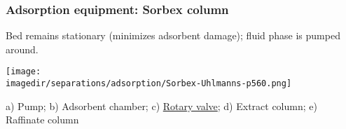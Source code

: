\begin{frame}\frametitle{Adsorption equipment: Sorbex column}
	{\scriptsize Bed remains stationary (minimizes adsorbent damage); fluid phase is pumped around.}
	\begin{center}
		\texttt{[image: \\imagedir/separations/adsorption/Sorbex-Uhlmanns-p560.png]}
	\end{center}
	\vspace{-12pt}

	{\tiny a) Pump; b) Adsorbent chamber; c) \href{http://www.uop.com/products/equipment/aromatics-separation/}{Rotary valve}; d) Extract column; e) Raffinate column}

	





\end{frame}
